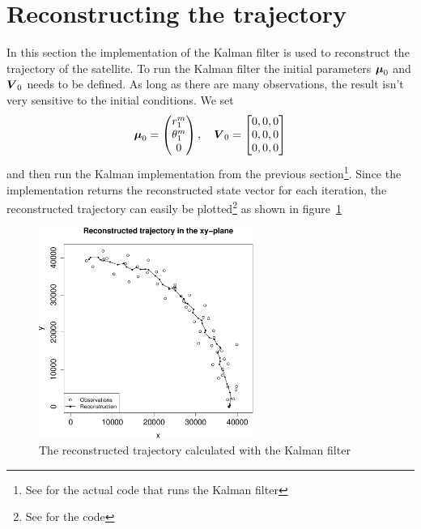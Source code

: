 \vspace{3mm}



\section*{Reconstructing the trajectory}
In this section the implementation of the Kalman filter is used to reconstruct the trajectory of the satellite. To run the Kalman filter the initial parameters $\boldsymbol{\mu}_0$ and $\boldsymbol{V}_0$ needs to be defined. As long as there are many observations, the result isn't very sensitive to the initial conditions. We set
\begin{equation*}
    \boldsymbol{\mu}_0 = \begin{pmatrix}
        r^m_1 \\
        \theta^m_1 \\
        0
    \end{pmatrix}, \quad \boldsymbol{V}_0 = \begin{bmatrix}
        0, 0, 0 \\
        0, 0, 0 \\
        0, 0, 0
    \end{bmatrix}
\end{equation*}
and then run the Kalman implementation from the previous section\footnote{See  for the actual code that runs the Kalman filter}. Since the implementation returns the reconstructed state vector for each iteration, the reconstructed trajectory can easily be plotted\footnote{See  for the code} as shown in figure~\ref{fig:reconstruction}

\begin{figure}[ht]
    \centering
    \includegraphics[width=70mm]{../plots/reconstruction.pdf}
    \caption{The reconstructed trajectory calculated with the Kalman filter}
    \label{fig:reconstruction}
\end{figure}


